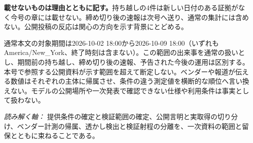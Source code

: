 \begin{tcolorbox}[enhanced,colback=SurveySoft,colframe=SurveyRule,boxrule=0.4pt,arc=1mm,left=3mm,right=3mm,top=2mm,bottom=2mm]
\textbf{載せないものは理由とともに記す。}\quad 持ち越しの4件は新しい日付のある証拠がなく今号の章には載せない。締め切り後の速報は次号へ送り、通常の集計には含めない。公開投稿の反応は関心の方向を示す背景にとどめる。
\end{tcolorbox}

\vspace{2mm}
\begin{claimboundary}[この号の読み方]
通常本文の対象期間は2026-10-02 18:00から2026-10-09 18:00（いずれもAmerica/New\_York、終了時刻は含まない）。この範囲の出来事を通常の扱いとし、期間前の持ち越し、締め切り後の速報、予告された今後の運用は区別する。本号で参照する公開資料が示す範囲を超えて断定しない。ベンダーや報道が伝える数値はそれぞれの主体に帰属させ、条件の違う測定値を横断的な順位へ言い換えない。モデルの公開場所や一次発表で確認できない仕様や利用条件は事実として扱わない。
\end{claimboundary}

\vspace{2mm}
\noindent\textit{読み解く軸：} 提供条件の確定と検証範囲の確定、公開言明と実取得の切り分け、ベンダー計測の帰属、透かし検出と検証射程の分離を、一次資料の範囲と留保とともに束ねることである。
